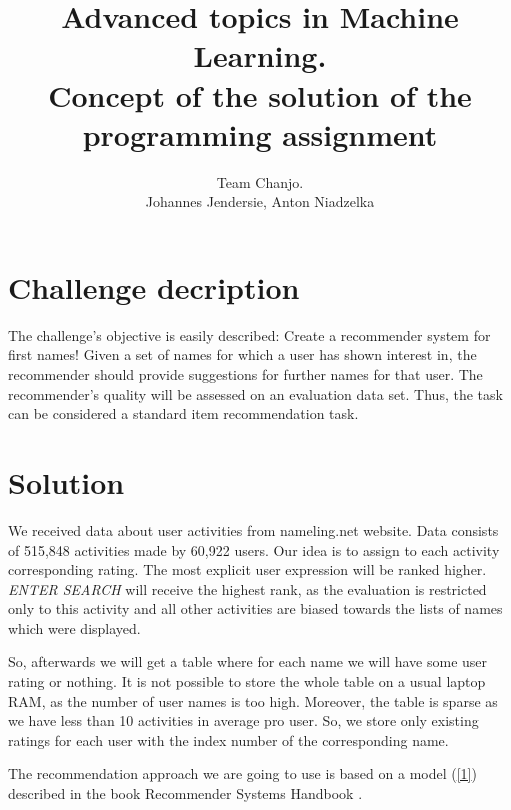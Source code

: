 \documentclass[pdftex,a4paper,11pt]{article}
\title{Advanced topics in Machine Learning. \\ Concept of the solution of the programming assignment}
\author{ Team Chanjo. \\ Johannes Jendersie, Anton Niadzelka }
\begin{document}
\maketitle

\section{Challenge decription}
The challenge’s objective is easily described: Create a recommender system for first names! Given a set of names for which a user has shown interest in, the recommender should provide suggestions for further names for that user. The recommender’s quality will be assessed on an evaluation data set. Thus, the task can be considered a standard item recommendation task.

\section{Solution}

We received data about user activities from nameling.net website. Data consists of 515,848 activities made by 60,922 users. Our idea is to assign to each activity corresponding rating. The most explicit user expression will be ranked higher. \textit{ENTER SEARCH} will receive the highest rank, as  the evaluation is restricted only to this activity and all other activities are biased towards the lists of names which were displayed. 


So, afterwards we will get a table where for each name we will have some user rating or nothing. It is not possible to store the whole table on a usual laptop RAM, as the number of user names is too high. Moreover, the table is sparse as we have less than 10 activities in average pro user. So, we store only existing ratings for each user with the index number of the corresponding name.

The recommendation approach we are going to use is based on a model (\ref{1}) described in the book Recommender Systems Handbook \cite{1}. 
\end{document}

